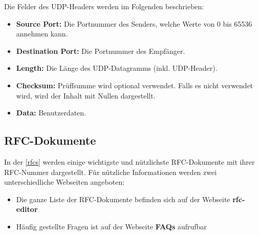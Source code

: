 Die Felder des UDP-Headers werden im Folgenden beschrieben:

\begin{itemize}
	\item \textbf{Source Port:} Die Portnummer des Senders, welche Werte von 0 bis 65536 annehmen kann.
	\item \textbf{Destination Port:} Die Portnummer des Empfänger.
	\item \textbf{Length:} Die Länge des UDP-Datagramms (inkl. UDP-Header).
	\item \textbf{Checksum:} Prüffsumme wird optional verwendet. Falls es nicht verwendet wird, wird der Inhalt mit Nullen dargestellt.
	\item \textbf{Data:} Benutzerdaten.
\end{itemize}

\subsection{RFC-Dokumente}

In der \autoref{rfcs} werden einige wichtigste und nützlichste RFC-Dokumente mit ihrer RFC-Nummer dargestellt. Für nützliche Informationen werden zwei unterschiedliche Webseiten angeboten: 

\begin{itemize}
	\item Die ganze Liste der RFC-Dokumente befinden sich auf der Webseite \textbf{rfc-editor} \cite{RFC-Editor}
	\item Häufig gestellte Fragen ist auf der Webseite \textbf{FAQs} \cite{FAQs} aufrufbar
\end{itemize} 

